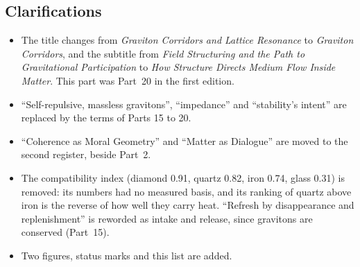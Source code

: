 \documentclass[11pt,a4paper]{article}
\begin{document}
\subsection*{Clarifications}
\begin{itemize}
\item The title changes from \emph{Graviton Corridors and Lattice Resonance} to \emph{Graviton Corridors}, and the subtitle from \emph{Field Structuring and the Path to Gravitational Participation} to \emph{How Structure Directs Medium Flow Inside Matter}. This part was Part~20 in the first edition.
\item ``Self-repulsive, massless gravitons'', ``impedance'' and ``stability's intent'' are replaced by the terms of Parts 15 to 20.
\item ``Coherence as Moral Geometry'' and ``Matter as Dialogue'' are moved to the second register, beside Part~2.
\item The compatibility index (diamond 0.91, quartz 0.82, iron 0.74, glass 0.31) is removed: its numbers had no measured basis, and its ranking of quartz above iron is the reverse of how well they carry heat. ``Refresh by disappearance and replenishment'' is reworded as intake and release, since gravitons are conserved (Part~15).
\item Two figures, status marks and this list are added.
\end{itemize}

\newpage


\end{document}
